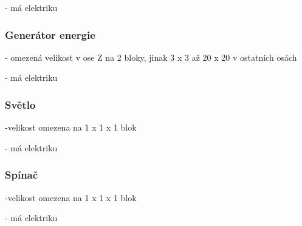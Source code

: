 - má elektriku

\subsubsection{Generátor energie}

- omezená velikost v ose Z na 2 bloky, jinak 3 x 3 až 20 x 20 v ostatních osách

- má elektriku

\subsubsection{Světlo}

-velikost omezena na 1 x 1 x 1 blok

- má elektriku

\subsubsection{Spínač}


-velikost omezena na 1 x 1 x 1 blok

- má elektriku